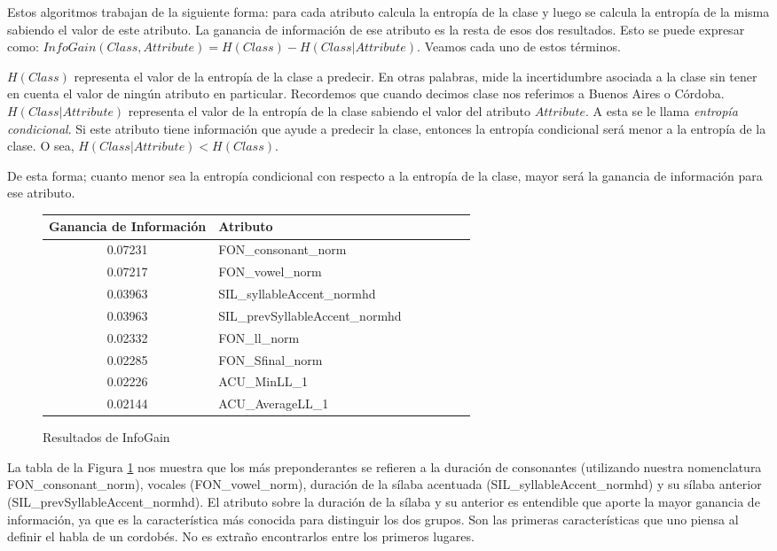 Estos algoritmos trabajan de la siguiente forma: para cada atributo calcula la entropía de la clase y luego se calcula la entropía de la misma sabiendo el valor de este atributo. La ganancia de información de ese atributo es la resta de esos dos resultados. Esto se puede expresar como: $InfoGain(Class,Attribute) = H(Class) - H(Class | Attribute)$. Veamos cada uno de estos términos.

$H(Class)$ representa el valor de la entropía de la clase a predecir. En otras palabras, mide la incertidumbre asociada a la clase sin tener en cuenta el valor de ningún atributo en particular. Recordemos que cuando decimos clase nos referimos a Buenos Aires o Córdoba. $H(Class | Attribute)$ representa el valor de la entropía de la clase sabiendo el valor del atributo $Attribute$. A esta se le llama \textit{entropía condicional}. Si este atributo tiene información que ayude a predecir la clase, entonces la entropía condicional será menor a la entropía de la clase. O sea, $H(Class | Attribute) < H(Class)$.  

De esta forma; cuanto menor sea la entropía condicional con respecto a la entropía de la clase, mayor será la ganancia de información para ese atributo.
\begin{figure}[H]
\begin{table}[H]
\centering
\begin{tabular}{|c|l|c|c|c|c|c|}
\hline
\textbf{Ganancia de Información} & \textbf{Atributo} \\ \hline
 0.07231     & FON\_consonant\_norm \\ \hline
 0.07217     & FON\_vowel\_norm \\ \hline
 0.03963     & SIL\_syllableAccent\_normhd \\ \hline
 0.03963     & SIL\_prevSyllableAccent\_normhd \\ \hline
 0.02332     & FON\_ll\_norm \\ \hline
 0.02285     & FON\_Sfinal\_norm \\ \hline
 0.02226     & ACU\_MinLL\_1 \\ \hline
 0.02144     & ACU\_AverageLL\_1 \\ \hline
\end{tabular}
\end{table}
\caption{Resultados de InfoGain}
\label{infogain-table}
\end{figure}

La tabla de la Figura \ref{infogain-table} nos muestra que los más preponderantes se refieren a la duración de consonantes (utilizando nuestra nomenclatura FON\_consonant\_norm), vocales (FON\_vowel\_norm), duración de la sílaba acentuada (SIL\_syllableAccent\_\-normhd) y su sílaba anterior (SIL\_prevSyllableAccent\_normhd). El atributo sobre la duración de la sílaba y su anterior es entendible que aporte la mayor ganancia de información, ya que es la característica más conocida para distinguir los dos grupos. Son las primeras características que uno piensa al definir el habla de un cordobés. No es extraño encontrarlos entre los primeros lugares. 

